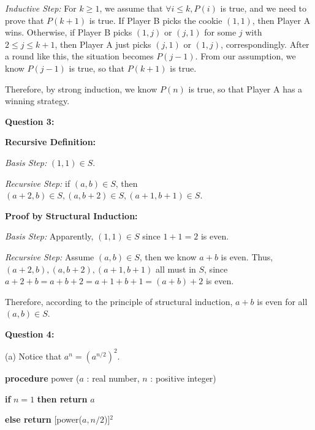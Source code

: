 \documentclass[a4paper,11pt]{article}
\begin{document}
\begin{spacing}{1.4}
    \textit{Inductive Step:}
    For $k\ge 1$, we assume that $\forall i\le k, P(i)$ is true,
    and we need to prove that $P(k+1)$ is true. If Player B
    picks the cookie $(1,1)$, then Player A wins. Otherwise, if Player
    B picks $(1,j)$ or $(j,1)$ for some $j$ with $2\le j\le k+1$,
    then Player A just picks $(j,1)$ or $(1,j)$, correspondingly.
    After a round like this, the situation becomes $P(j-1)$. 
    From our assumption, we know $P(j-1)$ is true, so that $P(k+1)$
    is true.

    Therefore, by strong induction, we know $P(n)$ is true, so that 
    Player A has a winning strategy.

    \vspace{20pt}

    \setlength{\parindent}{0em}

    \textbf{Question 3:}

    \textbf{Recursive Definition:}

    \hspace{2em} \textit{Basis Step:} $(1, 1)\in S$.

    \hspace{2em} \textit{Recursive Step:} 
    if $(a, b)\in S$, then $(a+2, b)\in S, (a, b+2) \in S, (a+1, b+1)\in S$.


    \textbf{Proof by Structural Induction:}

    \hspace{2em} \textit{Basis Step:} 
    Apparently, $(1, 1)\in S$ since $1+1=2$ is even.
    
    \hspace{2em} \textit{Recursive Step:} 
    Assume $(a,b)\in S$, then we know $a+b$ is even. Thus, 
    $(a+2, b), (a, b+2),  (a+1, b+1)$ all must in $S$, since
    $a+2+b=a+b+2=a+1+b+1=(a+b)+2$ is even.

    Therefore, according to the principle of structural induction,
    $a+b$ is even for all $(a,b)\in S$.


    \vspace{20pt}

    \textbf{Question 4:}

    (a) Notice that $a^{n}=(a^{n/2})^2.$

    \setlength{\parindent}{4em}

    \textbf{procedure} power ($a$ : real number, $n$ : positive integer) 
    
    \textbf{if} $n = 1$ \textbf{then return} $a$

    \textbf{else return} [power($a, n/2$)]$^2$


\end{spacing}
\end{document}
